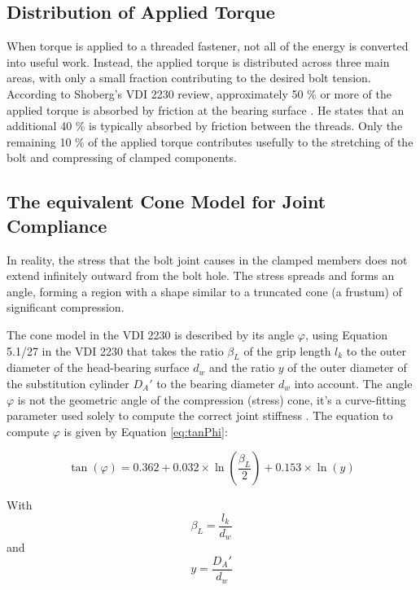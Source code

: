 \documentclass[a4paper,twoside]{bth}
\begin{document}
\subsection{Distribution of Applied Torque}
When torque is applied to a threaded fastener, not all of the energy is converted into useful work. Instead, the applied torque is distributed across three main areas, with only a small fraction contributing to the desired bolt tension. According to Shoberg's VDI 2230 review, approximately 50 \% or more of the applied torque is absorbed by friction at the bearing surface \cite{VDI_Fundamentals}. He states that an additional 40 \% is typically absorbed by friction between the threads. Only the remaining 10 \% of the applied torque contributes usefully to the stretching of the bolt and compressing of clamped components.

\subsection{The equivalent Cone Model for Joint Compliance}
In reality, the stress that the bolt joint causes in the clamped members does not extend infinitely outward from the bolt hole. The stress spreads and forms an angle, forming a region with a shape similar to a truncated cone (a frustum) of significant compression.

The cone model in the VDI 2230 is described by its angle $\varphi$, using Equation 5.1/27 in the VDI 2230 that takes the ratio $\beta_L$ of the grip length $l_k$ to the outer diameter of the head-bearing surface $d_w$ and the ratio $y$ of the outer diameter of the substitution cylinder $D_A'$ to the bearing diameter $d_w$ \cite{VDI} into account. The angle $\varphi$ is not the geometric angle of the compression (stress) cone, it's a curve-fitting parameter used solely to compute the correct joint stiffness \cite[p.35]{VDI}. The equation to compute $\varphi$ is given by Equation \ref{eq:tanPhi}:

\begin{equation} \label{eq:tanPhi}
    \tan({\varphi}) = 0.362 + 0.032 \times \ln\left(\frac{\beta_L}{2}\right) + 0.153 \times \ln\left(y\right)
\end{equation}

With
\begin{equation}
    \beta_L = \frac{l_k}{d_w}
\end{equation} and
\begin{equation}
    y = \frac{D_A'}{d_w}
\end{equation}
\end{document}
